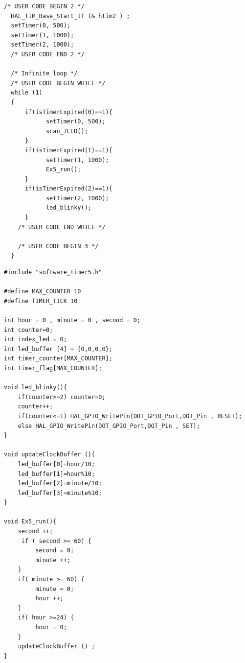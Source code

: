\begin{lstlisting}[caption=main.c]
/* USER CODE BEGIN 2 */
  HAL_TIM_Base_Start_IT (& htim2 ) ;
  setTimer(0, 500);
  setTimer(1, 1000);
  setTimer(2, 1000);
  /* USER CODE END 2 */

  /* Infinite loop */
  /* USER CODE BEGIN WHILE */
  while (1)
  {
	  if(isTimerExpired(0)==1){
	  	  	setTimer(0, 500);
	  	  	scan_7LED();
	  }
	  if(isTimerExpired(1)==1){
	  	  	setTimer(1, 1000);
	  	  	Ex5_run();
	  }
	  if(isTimerExpired(2)==1){
	  	  	setTimer(2, 1000);
	  	    led_blinky();
	  }
    /* USER CODE END WHILE */

    /* USER CODE BEGIN 3 */
  }
\end{lstlisting}
\begin{lstlisting}[caption=software$\_$timer5.c]
#include "software_timer5.h"

#define MAX_COUNTER 10
#define TIMER_TICK 10

int hour = 0 , minute = 0 , second = 0;
int counter=0;
int index_led = 0;
int led_buffer [4] = {0,0,0,0};
int timer_counter[MAX_COUNTER];
int timer_flag[MAX_COUNTER];

void led_blinky(){
	if(counter>=2) counter=0;
	counter++;
	if(counter<=1) HAL_GPIO_WritePin(DOT_GPIO_Port,DOT_Pin , RESET);
	else HAL_GPIO_WritePin(DOT_GPIO_Port,DOT_Pin , SET);
}

void updateClockBuffer (){
	led_buffer[0]=hour/10;
	led_buffer[1]=hour%10;
	led_buffer[2]=minute/10;
	led_buffer[3]=minute%10;
}

void Ex5_run(){
	second ++;
	 if ( second >= 60) {
		 second = 0;
		 minute ++;
	}
	if( minute >= 60) {
		 minute = 0;
		 hour ++;
	}
	if( hour >=24) {
		 hour = 0;
	}
	updateClockBuffer () ;
}


\end{lstlisting}
